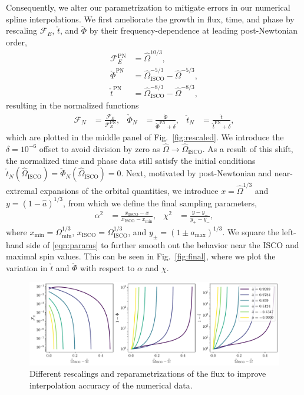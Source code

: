 \documentclass[%
 reprint,
 nofootinbib,
 amsmath,amssymb,
 aps,
 prd,
]{revtex4-2}
\begin{document}
Consequently, we alter our parametrization to mitigate errors in our numerical spline interpolations. We first ameliorate the growth in flux, time, and phase by rescaling $\mathcal{F}_E$, $\check{t}$, and $\check{\Phi}$ by their frequency-dependence at leading post-Newtonian order,
\begin{align}
    \mathcal{F}_E^\mathrm{PN} &= \hat{\Omega}^{10/3},
    \\
    \check{\Phi}^\mathrm{PN} &= \hat{\Omega}_\mathrm{ISCO}^{-5/3} - \hat{\Omega}^{-5/3},
    \\
    \check{t}^\mathrm{PN} &= \hat{\Omega}_\mathrm{ISCO}^{-8/3} - \hat{\Omega}^{-8/3},
\end{align}
resulting in the normalized functions
\begin{align}
    \mathcal{F}_N &= \frac{\mathcal{F}_E}{\mathcal{F}_E^\mathrm{PN}},
    &
    \check{\Phi}_N &= \frac{\check{\Phi}}{ \check{\Phi}^\mathrm{PN} + \delta},
    &
    \check{t}_N &= \frac{\check{t}}{\check{t}^\mathrm{PN} + \delta},
\end{align}
which are plotted in the middle panel of Fig.~\ref{fig:rescaled}. We introduce the $\delta = 10^{-6}$ offset to avoid division by zero as $\hat{\Omega} \rightarrow \hat{\Omega}_\mathrm{ISCO}$. As a result of this shift, the normalized time and phase data still satisfy the initial conditions $\check{t}_N(\hat{\Omega}_\mathrm{ISCO}) = \check{\Phi}_N(\hat{\Omega}_\mathrm{ISCO}) = 0$. Next, motivated by post-Newtonian and near-extremal expansions of the orbital quantities, we introduce $x = \hat{\Omega}^{1/3}$ and $y = (1 - \hat{a})^{1/3}$, from which we define the final sampling parameters,
\begin{align} \label{eqn:params}
    \alpha^2 &= \frac{x_\mathrm{ISCO}-x}{x_\mathrm{ISCO}-x_\mathrm{min}},
    &
    \chi^2 &= \frac{y-y_-}{y_+-y_-},
\end{align}
where $x_\mathrm{min} = \Omega_\mathrm{min}^{1/3}$, $x_\mathrm{ISCO} = \Omega_\mathrm{ISCO}^{1/3}$, and $y_\pm = (1 \pm a_\mathrm{max})^{1/3}$. We square the left-hand side of \eqref{eqn:params} to further smooth out the behavior near the ISCO and maximal spin values. This can be seen in Fig.~\ref{fig:final}, where we plot the variation in $\check{t}$ and $\check{\Phi}$ with respect to $\alpha$ and $\chi$.

\begin{figure}[!htp]
    \centering
    \includegraphics[width=0.95\linewidth]{figures/orginal_parametrization.pdf}
    \caption{Different rescalings and reparametrizations of the flux to improve interpolation accuracy of the numerical data.}
    \label{fig:original}
\end{figure}
\end{document}

